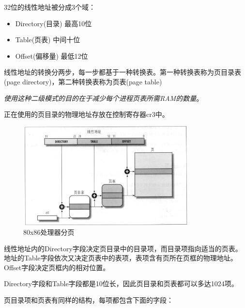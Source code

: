     32位的线性地址被分成3个域：

\begin{itemize}
    \item Directory(目录)
    \subitem 最高10位
    \item Table(页表)
    \subitem 中间十位
    \item Offset(偏移量)
    \subitem 最低12位
\end{itemize}

    线性地址的转换分两步，每一步都基于一种转换表。第一种转换表称为页目录表(page directory)，第二种转换表称为页表(page table)

    \emph{使用这种二级模式的目的在于减少每个进程页表所需RAM的数量}。

    正在使用的页目录的物理地址存放在控制寄存器cr3中。

\begin{figure}[!htbp]
    \centering
    \includegraphics[width=0.8\textwidth]{image/chapter02/80x86处理器分页.png}
    \caption{80x86处理器分页}
\end{figure}

    线性地址内的Directory字段决定页目录中的目录项，而目录项指向适当的页表。地址的Table字段依次又决定页表中的表项，表项含有页所在页框的物理地址。Offset字段决定页框内的相对位置。

    Directory字段和Table字段都是10位长，因此页目录和页表都可以多达1024项。

    页目录项和页表有同样的结构，每项都包含下面的字段：

